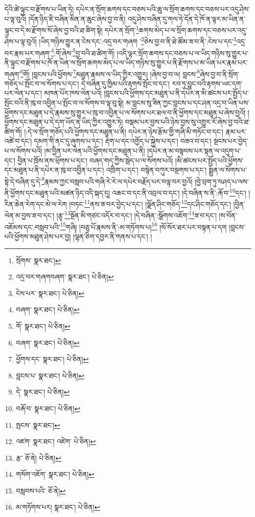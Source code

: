 དེའི་ཚེ་ལྟུང་བ་རྫོགས་པ་ཡིན་ཏེ། དཔེར་ན་སྲོག་ཆགས་དང་བཅས་པའི་ཆུ་ལ་སྲོག་ཆགས་དང་བཅས་པར་འདུ་ཤེས་པ་ལྟ་བུའོ། །དོན་ཉིད་ཇི་བཞིན་མིན་ན་ཆུང་ཞེས་བྱ་བ་ནི། འདུ་ཤེས་བཞིན་དུ་གལ་ཏེ་དོན་དེ་ཁོ་ན་ལྟར་མ་ཡིན་ན་ལྟུང་བ་དེ་མ་རྫོགས་སོ་ཞེས་བྱ་བའི་ཐ་ཚིག་སྟེ། དཔེར་ན་སྲོག་\footnote{སྲོགས་  སྣར་ཐང་། }ཆགས་མེད་པ་ལ་སྲོག་ཆགས་དང་བཅས་པར་འདུ་ཤེས་པ་ལྟ་བུའོ། །ཡིད་གཉིས་གྱུར་ན་ངེས་དང་:འདྲ་བར་གཞག ་\footnote{འདྲ་བར་གཞགབཞག་  སྣར་ཐང་།  པེ་ཅིན། }ཅེས་བྱ་བ་ནི་ཐེ་ཚོམ་ཟ་བ་ནི་:ངེས་པ་དང་\footnote{ངེས་པར་  སྣར་ཐང་།  པེ་ཅིན། }འདྲ་བར་རྣམ་པར་གཞག་\footnote{བཞག་  སྣར་ཐང་།  པེ་ཅིན། }:གོ་ཞེས་\footnote{གོ་  སྣར་ཐང་།  པེ་ཅིན། }བྱ་བའི་ཐ་ཚིག་གོ། །འདི་ལྟར་སྲོག་ཆགས་དང་བཅས་པ་ལ་ཡིད་གཉིས་སུ་གྱུར་པ་ནི་ལྟུང་བ་རྫོགས་པ་ཁོ་ན་ཡིན་ལ་སྲོག་ཆགས་མེད་པ་ལ་ཡིད་གཉིས་སུ་གྱུར་པ་ནི་རྫོགས་པ་མ་ཡིན་པར་རྣམ་པར་གཞག་\footnote{བཞག་  སྣར་ཐང་།  པེ་ཅིན། }གོ། །བླངས་པའི་ཕྱོགས་\footnote{ཕྱོགས་དང་  སྣར་ཐང་།  པེ་ཅིན། }མཐུན་རྣམས་ལ་ཡིད་ཀྱིར་འགྱུར། །ཞེས་བྱ་བ་ལ། བླངས་\footnote{བླངས་པ་  སྣར་ཐང་།  པེ་ཅིན། }ཞེས་བྱ་བ་ནི་སྲོག་གཅོད་པ་སྤོང་བ་ལ་སོགས་པ་དང་། དེ་བཞིན་དུ་ཁྱིམ་པའི་རྟགས་སྤོང་བ་དང་། རབ་ཏུ་བྱུང་བའི་རྟགས་ཡང་དག་པར་ལེན་པ་དང་། མཁན་པོར་ཁས་ལེན་པའོ། །བླངས་པའི་ཕྱོགས་དང་མཐུན་པ་ནི་དཔེར་ན་མི་ཚངས་པར་སྤྱོད་པ་སྤོང་བའི་ནི་ཁུ་བ་འབྱིན་པ་སྤོང་བ་ལ་སོགས་བ་ལྟ་བུ་སྟེ། མ་བླངས་སུ་ཟིན་ཀྱང་བླངས་པ་དང་ཤན་འདྲ་བ་ཡིན་པས་ཕྱོགས་དང་མཐུན་པ་དེ་རྣམས་སུ་གྱུར་པ་ཁུ་བ་འབྱིན་པ་ལ་སོགས་པར་ཐལ་བ་ནི་ཕྱོགས་དང་མཐུན་པ་ཞེས་བྱའོ། །ཕྱོགས་དང་མཐུན་པ་དེ་དག་ཡོད་ན་ཡིད་ཀྱིར་འགྱུར་ཏེ། བསྡམ་པར་བྱས་པའི་ཉེས་བྱས་སུ་འགྱུར་རོ་ཞེས་བྱ་བའི་ཐ་ཚིག་གོ། །:དེ་ལ་སྲོག་གཅོད་པའི་ཕྱོགས་དང་མཐུན་པ་ནི། དཔེར་ན་ཉེས་རྩོམ་གྱི་གཞི་མི་གཏོང་བ་དང་། རྣམ་པར་འཚེ་བ་དང་། དམག་གི་ནང་དུ་ཞུགས་པ་དང་། རྡེག་པ་དང་འགྱོད་པ་སྐྱེས་པ་དང་། བཟའ་བ་དང་། སྔངས་པར་བྱེད་པ་ལ་སོགས་པའོ། །མ་བྱིན་པར་ལེན་པའི་ཕྱོགས་དང་མཐུན་པ་ནི། །དཔེར་ན་མ་བསྟབས་པར་སྟན་ལ་འདུག་པ་དང་། བྱིན་པ་ཁྲོས་ནས་ཕྲོགས་པ་དང་། བཞད་གད་ཀྱིས་སྦེད་པ་ལ་སོགས་པའོ། །མི་ཚངས་པར་སྤྱོད་པའི་ཕྱོགས་དང་མཐུན་པ་ནི་དཔེར་ན་ཁུ་བ་འབྱིན་པ་དང་། འཁྲིག་པ་དང་། བསྙེན་བཀུར་བསྔགས་པ་དང་། སྨྱན་ལ་སོགས་པ་སྟེ་དེ་བཞིན་དུ་དེ་\footnote{དེ་  སྣར་ཐང་།  པེ་ཅིན། }རྣམས་ཀྱང་བསླབ་པའི་གཞི་རེ་རེ་ལ་དཔེར་བརྗོད་པར་བལྟ་བར་བྱའོ། །བྱེ་བྲག་ཏུ་བཤད་པ་ལས་ནི་ཕྱོགས་དང་མཐུན་པའི་མཚན་ཉིད་འདི་སྐད་དུ། འཆང་བ་དང་ནི་འབྲལ་བ་དང་། །དེ་བཞིན་ས་ནི་:རྐོ་བ་\footnote{བརྐོ་བ་  སྣར་ཐང་།  པེ་ཅིན། }དང་། །རིན་ཆེན་རེག་དང་མེ་ལ་རེག །བཏང་\footnote{སྤངས་  སྣར་ཐང་། }ནས་ཟ་བར་བྱེད་པ་དང་། །ལྗོན་ཤིང་གཅོད་\footnote{འཛག་  སྣར་ཐང་། འཛེག་  པེ་ཅིན། }དང་ཤིང་གཅོད་དང་། །བྱིན་ལེན་མ་བྱས་ཟ་བ་དང་། །རྩྭ་\footnote{རྩ་  ཅོ་ནེ།  པེ་ཅིན། }སྔོན་མི་གཙང་འདོར་བ་དང་། །དེ་བཞིན་:སྩོགས་འཇོག་\footnote{གསོག་འཇོག་  སྣར་ཐང་།  པེ་ཅིན། }ཟ་བ་དང་། །ས་བོན་འཇོམས་དང་:བསླབ་པའི་\footnote{བསླབས་པའི་  ཅོ་ནེ། }གཞི། །བཅུ་པོ་རྣམས་ནི་:མ་གཏོགས་པ།\footnote{མ་གཏོགས་པར།  སྣར་ཐང་།  པེ་ཅིན། } །སོ་སོར་ཐར་པར་བསྟན་པ་དག །བླངས་པའི་ཕྱོགས་མཐུན་ཤེས་པར་བྱ། །ལྷན་ཅིག་དབྱར་ནི་གནས་པ་དང་། །
